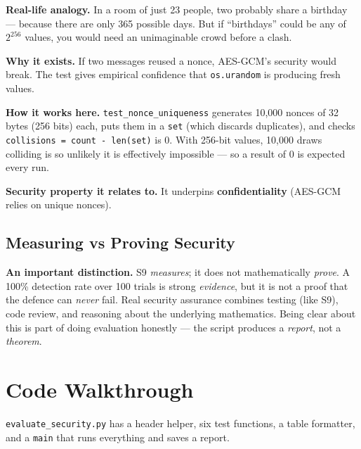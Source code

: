 \documentclass[11pt,a4paper]{article}
\begin{document}
\textbf{Real-life analogy.} In a room of just 23 people, two probably share a
birthday --- because there are only 365 possible days. But if ``birthdays'' could
be any of $2^{256}$ values, you would need an unimaginable crowd before a clash.

\textbf{Why it exists.} If two messages reused a nonce, AES-GCM's security would
break. The test gives empirical confidence that \texttt{os.urandom} is producing
fresh values.

\textbf{How it works here.} \texttt{test\_nonce\_uniqueness} generates 10{,}000
nonces of 32 bytes (256 bits) each, puts them in a \texttt{set} (which discards
duplicates), and checks \texttt{collisions = count - len(set)} is 0. With 256-bit
values, 10{,}000 draws colliding is so unlikely it is effectively impossible ---
so a result of 0 is expected every run.

\textbf{Security property it relates to.} It underpins \textbf{confidentiality}
(AES-GCM relies on unique nonces).

\subsection{Measuring vs Proving Security}
\textbf{An important distinction.} S9 \emph{measures}; it does not mathematically
\emph{prove}. A 100\% detection rate over 100 trials is strong \emph{evidence},
but it is not a proof that the defence can \emph{never} fail. Real security
assurance combines testing (like S9), code review, and reasoning about the
underlying mathematics. Being clear about this is part of doing evaluation
honestly --- the script produces a \emph{report}, not a \emph{theorem}.

\section{Code Walkthrough}

\texttt{evaluate\_security.py} has a header helper, six test functions, a table
formatter, and a \texttt{main} that runs everything and saves a report.
\end{document}
